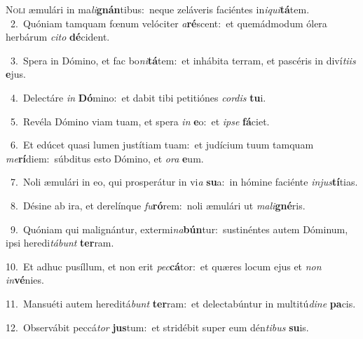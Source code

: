 \lettrine{\initial\textcolor{\initialcolor}{N}}{oli} æmulári in ma\-\textit{li}\-\textbf{gnán}tibus:~\star neque zeláveris faciéntes in\-\textit{i}\-\textit{qui}\textbf{tá}tem.\\
{\numbfont\textcolor{\numbcolor}{~2.}}~Quóniam tamquam fœnum velóciter \textit{a}\-\textbf{ré}scent:~\star et quemádmodum ólera herbárum \textit{ci}\-\textit{to} \textbf{dé}\-cident.\par
{\numbfont\textcolor{\numbcolor}{~3.}}~Spera in Dómino, et fac bo\-\textit{ni}\-\textbf{tá}tem:~\star et inhábita terram, et pascéris in diví\-\textit{ti}\-\textit{is} \textbf{e}\-jus.\par
{\numbfont\textcolor{\numbcolor}{~4.}}~Delectáre \textit{in} \textbf{Dó}\-mino:~\star et dabit tibi petitiónes \textit{cor}\-\textit{dis} \textbf{tu}\-i.\par
{\numbfont\textcolor{\numbcolor}{~5.}}~Revéla Dómino viam tuam, et spera \textit{in} \textbf{e}\-o:~\star et \textit{ip}\-\textit{se} \textbf{fá}\-ciet.\par
{\numbfont\textcolor{\numbcolor}{~6.}}~Et edúcet quasi lumen justítiam tuam:~\dagger et judícium tuum tamquam \textit{me}\-\textbf{rí}diem:~\star súbditus esto Dómino, et \textit{o}\-\textit{ra} \textbf{e}\-um.\par
{\numbfont\textcolor{\numbcolor}{~7.}}~Noli æmulári in eo, qui prosperátur in vi\textit{a} \textbf{su}\-a:~\star in hómine faciénte \textit{in}\-\textit{jus}\textbf{tí}tias.\par
{\numbfont\textcolor{\numbcolor}{~8.}}~Désine ab ira, et derelínque \textit{fu}\-\textbf{ró}rem:~\star noli æmulári ut \textit{ma}\-\textit{li}\textbf{gné}ris.\par
{\numbfont\textcolor{\numbcolor}{~9.}}~Quóniam qui malignántur, extermi\-\textit{na}\-\textbf{bún}tur:~\star sustinéntes autem Dóminum, ipsi heredi\-\textit{tá}\-\textit{bunt} \textbf{ter}\-ram.\par
{\numbfont\textcolor{\numbcolor}{10.}}~Et adhuc pusíllum, et non erit \textit{pec}\-\textbf{cá}tor:~\star et quæres locum ejus et \textit{non} \textit{in}\-\textbf{vé}nies.\par
{\numbfont\textcolor{\numbcolor}{11.}}~Mansuéti autem hereditá\textit{bunt} \textbf{ter}\-ram:~\star et delectabúntur in multitú\-\textit{di}\-\textit{ne} \textbf{pa}\-cis.\par
{\numbfont\textcolor{\numbcolor}{12.}}~Observábit peccá\textit{tor} \textbf{jus}\-tum:~\star et stridébit super eum dén\-\textit{ti}\-\textit{bus} \textbf{su}\-is.\par
